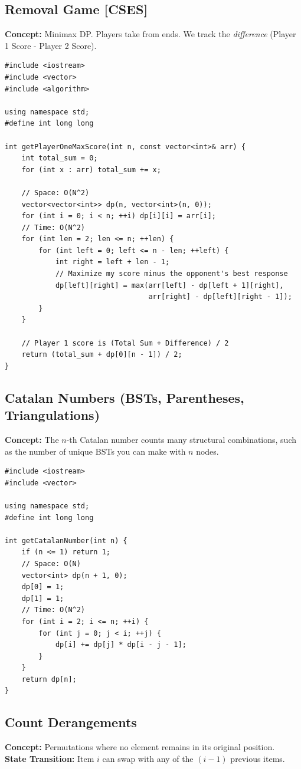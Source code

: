 \subsection{Removal Game [CSES]}
\textbf{Concept:} Minimax DP. Players take from ends. We track the \textit{difference} (Player 1 Score - Player 2 Score).

\begin{lstlisting}
#include <iostream>
#include <vector>
#include <algorithm>

using namespace std;
#define int long long

int getPlayerOneMaxScore(int n, const vector<int>& arr) {
    int total_sum = 0;
    for (int x : arr) total_sum += x;
    
    // Space: O(N^2)
    vector<vector<int>> dp(n, vector<int>(n, 0));
    for (int i = 0; i < n; ++i) dp[i][i] = arr[i];
    // Time: O(N^2)
    for (int len = 2; len <= n; ++len) {
        for (int left = 0; left <= n - len; ++left) {
            int right = left + len - 1;
            // Maximize my score minus the opponent's best response
            dp[left][right] = max(arr[left] - dp[left + 1][right], 
                                  arr[right] - dp[left][right - 1]);
        }
    }
    
    // Player 1 score is (Total Sum + Difference) / 2
    return (total_sum + dp[0][n - 1]) / 2;
}
\end{lstlisting}

\subsection{Catalan Numbers (BSTs, Parentheses, Triangulations)}
\textbf{Concept:} The $n$-th Catalan number counts many structural combinations, such as the number of unique BSTs you can make with $n$ nodes.

\begin{lstlisting}
#include <iostream>
#include <vector>

using namespace std;
#define int long long

int getCatalanNumber(int n) {
    if (n <= 1) return 1;
    // Space: O(N)
    vector<int> dp(n + 1, 0);
    dp[0] = 1;
    dp[1] = 1;
    // Time: O(N^2)
    for (int i = 2; i <= n; ++i) {
        for (int j = 0; j < i; ++j) {
            dp[i] += dp[j] * dp[i - j - 1];
        }
    }
    return dp[n];
}
\end{lstlisting}

\subsection{Count Derangements}
\textbf{Concept:} Permutations where no element remains in its original position.
\\
\textbf{State Transition:} Item $i$ can swap with any of the $(i-1)$ previous items. 

